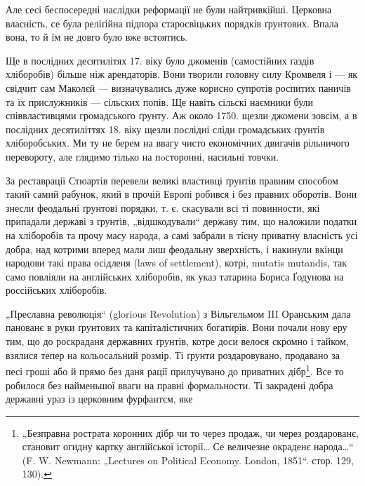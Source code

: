 Але сесі беспосередні наслідки реформації не були
найтривкійші. Церковна власність, се була реліґійна підпора
старосвіцьких порядків ґрунтових. Впала вона, то й їм не
довго було вже встоятись.

Ще в послідних десятилітях 17. віку було джоменів
(самостійних ґаздів хліборобів) більше ніж арендаторів.
Вони творили головну силу Кромвеля і — як свідчит сам
Маколєй — визначувались дуже корисно супротів роспитих
паничів та їх прислужників — сільских попів. Ще навіть
сільскі наємники були співвластивцями громадського ґрунту.
Аж около 1750. щезли джомени зовсім, а в послідних десятиліттях
18. віку щезли послідні сліди громадських ґрунтів
хліборобських. Ми ту не берем на ввагу чисто економічних
двигачів рільничого перевороту, але глядимо тілько на пoсторонні,
насильні товчки.

За реставрації Стюартів перевели великі властивці
ґрунтів правним способом такий самий рабунок, який в прочій
Европі робився і без правних оборотів. Вони знесли
феодальні ґрунтові порядки, т. є. скасували всі ті повинности,
які припадали державі з ґрунтів, „відшкодували“ державу
тим, що наложили податки на хліборобів та прочу
масу народа, а самі забрали в тісну приватну власність усі
добра, над котрими вперед мали лиш феодальну зверхність,
і накинули вкінци народови такі права осідленя (laws of
settlement), котрі, mutatis mutandis, так само повліяли на
англійських хліборобів, як указ татарина Бориса Ґодунова
на россійських хліборобів.

„Преславна революція“ (glorious Revolution) з Вільгельмом
III Оранським дала панованє в руки ґрунтових та капіталістичних
богатирів. Вони почали нову еру тим, що до
роскраданя державних ґрунтів, котре доси велося скромно
і тайком, взялися тепер на кольосальний розмір. Ті ґрунти
роздаровувано, продавано за песі гроші або й прямо без
даня рації прилучувано до приватних дібр\footnote{
„Безправна рострата коронних дібр чи то через продаж, чи через
роздарованє, становит огидну картку англійської історії\dots{} Се величезне
окраденє народа\dots{}“ (F. W. Newmann: „Lectures on Political Economy.
London, 1851“. стор. 129, 130).
}. Все то робилося
без найменьшої вваги на правні формальности. Ті закрадені
добра державні ураз із церковним фурфантєм, яке
\parbreak{}
